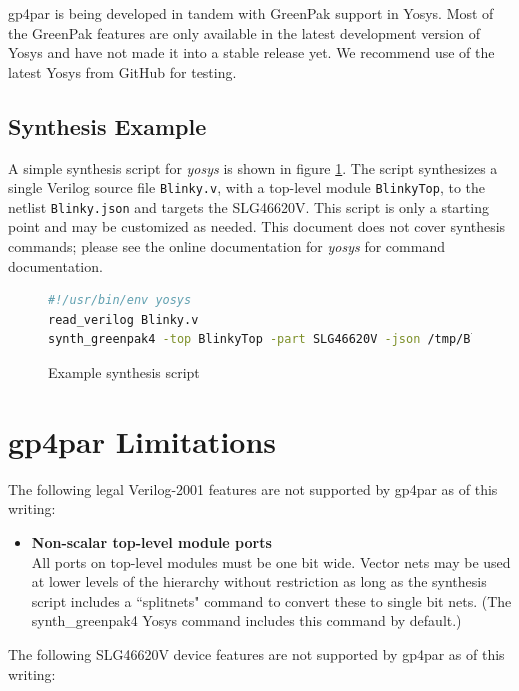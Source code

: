\documentclass[11pt]{article}
\begin{document}
gp4par is being developed in tandem with GreenPak support in Yosys. Most of the GreenPak features are only available in 
the latest development version of Yosys and have not made it into a stable release yet. We recommend use of the latest 
Yosys from GitHub for testing.

\subsection{Synthesis Example}

A simple synthesis script for \emph{yosys} is shown in figure \ref{yscript}. The script synthesizes a single Verilog 
source file \texttt{Blinky.v}, with a top-level module \texttt{BlinkyTop}, to the netlist \texttt{Blinky.json} and 
targets the SLG46620V. This script is only a starting point and may be customized as needed. This document does not
cover synthesis commands; please see the online documentation for \emph{yosys} for command documentation.
\begin{figure}[h]
\begin{lstlisting}[language=sh]
#!/usr/bin/env yosys
read_verilog Blinky.v
synth_greenpak4 -top BlinkyTop -part SLG46620V -json /tmp/Blinky.json
\end{lstlisting}
\caption{Example synthesis script}
\label{yscript}
\end{figure}

\pagebreak
\section{gp4par Limitations}

The following legal Verilog-2001 features are not supported by gp4par as of this writing:

\begin{itemize}
\item {\bfseries Non-scalar top-level module ports}\\All ports on top-level modules must be one bit wide. Vector nets 
may be used at lower levels of the hierarchy without restriction as long as the synthesis script includes a
``splitnets" command to convert these to single bit nets. (The synth\_greenpak4 Yosys command includes this command by 
default.)
\end{itemize}

The following SLG46620V device features are not supported by gp4par as of this writing:
\end{document}
